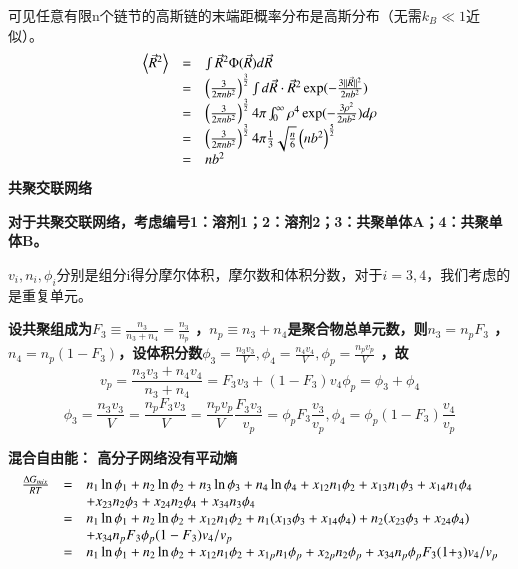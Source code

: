 \documentclass{article} %
\begin{document}
可见任意有限n个链节的高斯链的末端距概率分布是高斯分布（无需$k_{B} \ll 1$近似）。
\[\begin{array}{rcl} {\left\langle \vec{R}^{2} \right\rangle } & {=} & {\smallint \vec{R}^{2} {\rm \Phi }(\vec{R})d\vec{R}} \\ {} & {=} & {\left(\frac{3}{2\pi nb^{2} } \right)^{\frac{3}{2} } \smallint d\vec{R}\cdot \vec{R}^{2} \exp (-\frac{3\parallel \vec{R}\parallel ^{2} }{2nb^{2} } )} \\ {} & {=} & {\left(\frac{3}{2\pi nb^{2} } \right)^{\frac{3}{2} } 4\pi \smallint _{0}^{\infty } \rho ^{4} \exp (-\frac{3\rho ^{2} }{2nb^{2} } )d\rho } \\ {} & {=} & {\left(\frac{3}{2\pi nb^{2} } \right)^{\frac{3}{2} } 4\pi \frac{1}{3} \sqrt{\frac{n}{6} } \left(nb^{2} \right)^{\frac{5}{2} } } \\ {} & {=} & {nb^{2} } \end{array}\] 
\textbf{共聚交联网络}


{\bf  对于共聚交联网络，考虑编号1：溶剂1；2：溶剂2；3：共聚单体A；4：共聚单体B。}

\noindent $v_{i} ,n_{i} ,\phi _{i} $分别是组分i得分摩尔体积，摩尔数和体积分数，对于$i=3,4$，我们考虑的是重复单元。

\noindent 
{\bf 设共聚组成为$F_{3} \equiv \frac{n_{3} }{n_{3} +n_{4} } =\frac{n_{3} }{n_{p} } $ ，$n_{p} \equiv n_{3} +n_{4} $是聚合物总单元数，则$n_{3} =n_{p} F_{3} $ ，$n_{4} =n_{p} (1-F_{3} )$，设体积分数$\phi _{3} =\frac{n_{3} v_{3} }{V} ,\phi _{4} =\frac{n_{4} v_{4} }{V} ,\phi _{p} =\frac{n_{p} v_{p} }{V} $ ，故
\[v_{p} =\frac{n_{3} v_{3} +n_{4} v_{4} }{n_{3} +n_{4} } =F_{3} v_{3} +(1-F_{3} )v_{4}    \phi _{p} =\phi _{3} +\phi _{4} \] 
\[\phi _{3} =\frac{n_{3} v_{3} }{V} =\frac{n_{p} F_{3} v_{3} }{V} =\frac{n_{p} v_{p} }{V} \frac{F_{3} v_{3} }{v_{p} } =\phi _{p} F_{3} \frac{v_{3} }{v_{p} } ,\phi _{4} =\phi _{p} (1-F_{3} )\frac{v_{4} }{v_{p} } \] }

{\bf 混合自由能：            高分子网络没有平动熵
\[\begin{array}{rcl} {\frac{{\rm \Delta }G_{mix} }{RT} } & {=} & {n_{1} \ln \phi _{1} +n_{2} \ln \phi _{2} +n_{3} \ln \phi _{3} +n_{4} \ln \phi _{4} +x_{12} n_{1} \phi _{2} +x_{13} n_{1} \phi _{3} +x_{14} n_{1} \phi _{4} } \\ {} & {} & {+x{}_{23} n{}_{2} \phi {}_{3} +x{}_{24} n{}_{2} \phi {}_{4} +x{}_{34} n{}_{3} \phi {}_{4} } \\ {} & {=} & {n_{1} \ln \phi _{1} +n_{2} \ln \phi _{2} +x_{12} n_{1} \phi _{2} +n_{1} (x_{13} \phi _{3} +x_{14} \phi _{4} )+n_{2} (x_{23} \phi _{3} +x_{24} \phi _{4} )} \\ {} & {} & {+x_{34} n{}_{p} F{}_{3} \phi {}_{p} (1-F{}_{3} )v{}_{4} /v{}_{p} } \\ {} & {=} & {n_{1} \ln \phi _{1} +n_{2} \ln \phi _{2} +x_{12} n_{1} \phi _{2} +x_{1p} n_{1} \phi _{p} +x_{2p} n_{2} \phi _{p} +x_{34} n_{p} \phi _{p} F_{3} (1+_{3} )v_{4} /v_{p} } \end{array}\] }
\end{document}
